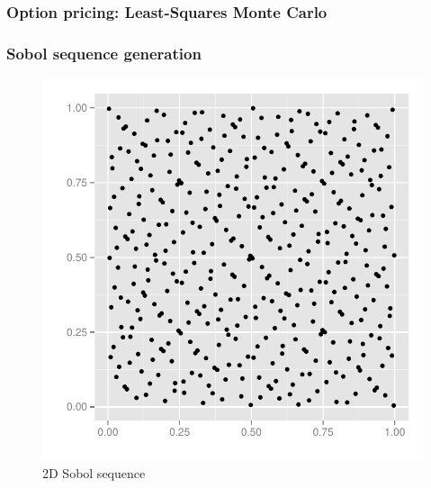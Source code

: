 \documentclass{beamer}
\begin{document}
\begin{frame}
  \frametitle{Option pricing: Least-Squares Monte Carlo}
  
\end{frame}

\begin{frame}
  \frametitle{Sobol sequence generation}
   \vspace{-5mm}
   \begin{minipage}[t]{0.48\linewidth}
     \begin{figure}
       \centering
       \includegraphics[width=\textwidth]{graphics/2D-sobol-sequence.pdf}
       \vspace{-5mm}
       \caption{2D Sobol sequence}
   \label{fig:2dsobolseq}
 \end{figure}


\end{minipage}
\end{frame}
\end{document}

